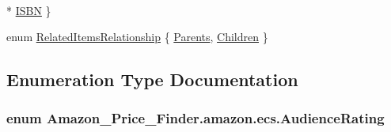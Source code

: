 \begin{DoxyCompactItemize}
\\*
\hyperlink{namespace_amazon___price___finder_1_1amazon_1_1ecs_a12947455ed0d6c4f6a37bd145e87bc32}{I\-S\-B\-N}
 \}
\begin{DoxyCompactList}\small\item\em \end{DoxyCompactList}\item 
enum \hyperlink{namespace_amazon___price___finder_1_1amazon_1_1ecs_ae8ff61a0051155ad230e93cae71432fb}{Related\-Items\-Relationship} \{ \hyperlink{namespace_amazon___price___finder_1_1amazon_1_1ecs_ae8ff61a0051155ad230e93cae71432fb}{Parents}, 
\hyperlink{namespace_amazon___price___finder_1_1amazon_1_1ecs_ae8ff61a0051155ad230e93cae71432fb}{Children}
 \}
\begin{DoxyCompactList}\small\item\em \end{DoxyCompactList}\end{DoxyCompactItemize}


\subsection{Enumeration Type Documentation}
\hypertarget{namespace_amazon___price___finder_1_1amazon_1_1ecs_acc5bf7450f78b8691eaac79f65776a7d}{
\subsubsection[{Audience\-Rating}]{\setlength{\rightskip}{0pt plus 5cm}enum {\bf Amazon\-\_\-\-Price\-\_\-\-Finder.\-amazon.\-ecs.\-Audience\-Rating}}}\label{namespace_amazon___price___finder_1_1amazon_1_1ecs_acc5bf7450f78b8691eaac79f65776a7d}




